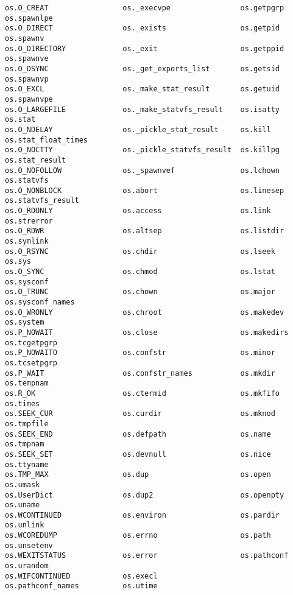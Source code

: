 \begin{verbatim}
os.O_CREAT                 os._execvpe                os.getpgrp                 os.spawnlpe
os.O_DIRECT                os._exists                 os.getpid                  os.spawnv
os.O_DIRECTORY             os._exit                   os.getppid                 os.spawnve
os.O_DSYNC                 os._get_exports_list       os.getsid                  os.spawnvp
os.O_EXCL                  os._make_stat_result       os.getuid                  os.spawnvpe
os.O_LARGEFILE             os._make_statvfs_result    os.isatty                  os.stat
os.O_NDELAY                os._pickle_stat_result     os.kill                    os.stat_float_times
os.O_NOCTTY                os._pickle_statvfs_result  os.killpg                  os.stat_result
os.O_NOFOLLOW              os._spawnvef               os.lchown                  os.statvfs
os.O_NONBLOCK              os.abort                   os.linesep                 os.statvfs_result
os.O_RDONLY                os.access                  os.link                    os.strerror
os.O_RDWR                  os.altsep                  os.listdir                 os.symlink
os.O_RSYNC                 os.chdir                   os.lseek                   os.sys
os.O_SYNC                  os.chmod                   os.lstat                   os.sysconf
os.O_TRUNC                 os.chown                   os.major                   os.sysconf_names
os.O_WRONLY                os.chroot                  os.makedev                 os.system
os.P_NOWAIT                os.close                   os.makedirs                os.tcgetpgrp
os.P_NOWAITO               os.confstr                 os.minor                   os.tcsetpgrp
os.P_WAIT                  os.confstr_names           os.mkdir                   os.tempnam
os.R_OK                    os.ctermid                 os.mkfifo                  os.times
os.SEEK_CUR                os.curdir                  os.mknod                   os.tmpfile
os.SEEK_END                os.defpath                 os.name                    os.tmpnam
os.SEEK_SET                os.devnull                 os.nice                    os.ttyname
os.TMP_MAX                 os.dup                     os.open                    os.umask
os.UserDict                os.dup2                    os.openpty                 os.uname
os.WCONTINUED              os.environ                 os.pardir                  os.unlink
os.WCOREDUMP               os.errno                   os.path                    os.unsetenv
os.WEXITSTATUS             os.error                   os.pathconf                os.urandom
os.WIFCONTINUED            os.execl                   os.pathconf_names          os.utime

\end{verbatim}
